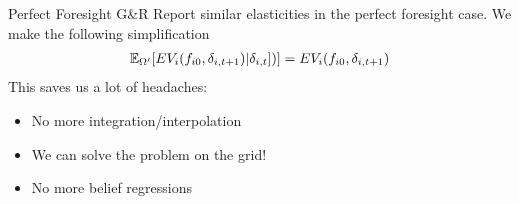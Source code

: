 \begin{frame}{Perfect Foresight}
G\&R Report similar elasticities in the perfect foresight case. We make the following simplification
\begin{eqnarray*}
\mathbb{E}_{\Omega'}[ EV_i (f_{i0}, \delta_{i,t+1}) |\delta_{i,t}] )] = EV_i (f_{i0}, \delta_{i,t+1})
\end{eqnarray*}
This saves us a lot of headaches:
\begin{itemize}
\item No more integration/interpolation
\item We can solve the problem on the grid!
\item No more belief regressions
\end{itemize}
\end{frame}
%
%
%

